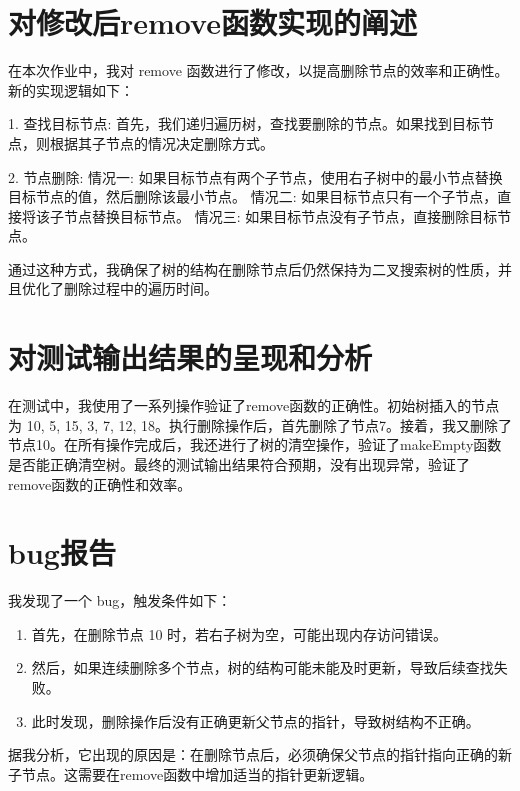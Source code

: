 \documentclass[UTF8]{ctexart}
\begin{document}
\pagestyle{fancy}
\fancyhead{}

\section{对修改后remove函数实现的阐述}

在本次作业中，我对 remove 函数进行了修改，以提高删除节点的效率和正确性。新的实现逻辑如下：

1. 查找目标节点: 首先，我们递归遍历树，查找要删除的节点。如果找到目标节点，则根据其子节点的情况决定删除方式。

2. 节点删除:
   情况一: 如果目标节点有两个子节点，使用右子树中的最小节点替换目标节点的值，然后删除该最小节点。
   情况二: 如果目标节点只有一个子节点，直接将该子节点替换目标节点。
   情况三: 如果目标节点没有子节点，直接删除目标节点。

通过这种方式，我确保了树的结构在删除节点后仍然保持为二叉搜索树的性质，并且优化了删除过程中的遍历时间。

\section{对测试输出结果的呈现和分析}
在测试中，我使用了一系列操作验证了remove函数的正确性。初始树插入的节点为 10, 5, 15, 3, 7, 12, 18。执行删除操作后，首先删除了节点7。接着，我又删除了节点10。在所有操作完成后，我还进行了树的清空操作，验证了makeEmpty函数是否能正确清空树。最终的测试输出结果符合预期，没有出现异常，验证了remove函数的正确性和效率。

\section{bug报告}

我发现了一个 bug，触发条件如下：

\begin{enumerate}
    \item 首先，在删除节点 10 时，若右子树为空，可能出现内存访问错误。
    \item 然后，如果连续删除多个节点，树的结构可能未能及时更新，导致后续查找失败。
    \item 此时发现，删除操作后没有正确更新父节点的指针，导致树结构不正确。
\end{enumerate}

据我分析，它出现的原因是：在删除节点后，必须确保父节点的指针指向正确的新子节点。这需要在remove函数中增加适当的指针更新逻辑。
\end{document}
